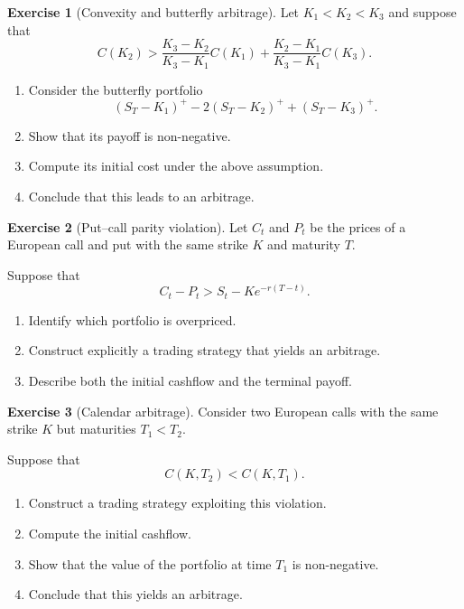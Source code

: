 \documentclass[11pt]{article}
\newcommand{\1}{\mathbf{1}}
\theoremstyle{definition}
\newtheorem{exercise}{Exercise}[section]
\begin{document}
\begin{exercise}[Convexity and butterfly arbitrage]
Let \(K_1<K_2<K_3\) and suppose that
\[
C(K_2) > \frac{K_3-K_2}{K_3-K_1}C(K_1)
+
\frac{K_2-K_1}{K_3-K_1}C(K_3).
\]

\begin{enumerate}[leftmargin=1.6em]
\item Consider the butterfly portfolio
\[
(S_T-K_1)^+ - 2(S_T-K_2)^+ + (S_T-K_3)^+.
\]

\item Show that its payoff is non-negative.

\item Compute its initial cost under the above assumption.

\item Conclude that this leads to an arbitrage.
\end{enumerate}
\end{exercise}


\begin{exercise}[Put--call parity violation]
Let \(C_t\) and \(P_t\) be the prices of a European call and put with the same strike \(K\) and maturity \(T\).

Suppose that
\[
C_t - P_t > S_t - K e^{-r(T-t)}.
\]

\begin{enumerate}[leftmargin=1.6em]
\item Identify which portfolio is overpriced.

\item Construct explicitly a trading strategy that yields an arbitrage.

\item Describe both the initial cashflow and the terminal payoff.
\end{enumerate}
\end{exercise}


\begin{exercise}[Calendar arbitrage]
Consider two European calls with the same strike \(K\) but maturities \(T_1<T_2\).

Suppose that
\[
C(K,T_2) < C(K,T_1).
\]

\begin{enumerate}[leftmargin=1.6em]
\item Construct a trading strategy exploiting this violation.

\item Compute the initial cashflow.

\item Show that the value of the portfolio at time \(T_1\) is non-negative.

\item Conclude that this yields an arbitrage.
\end{enumerate}
\end{exercise}
\end{document}
